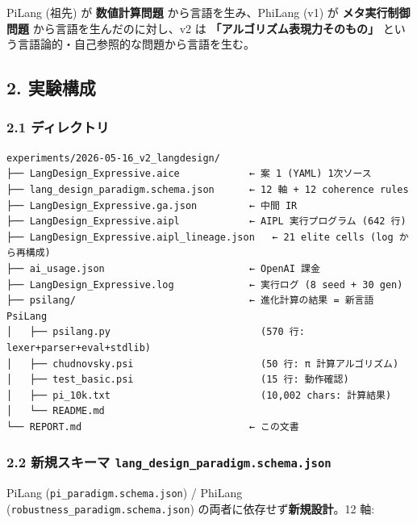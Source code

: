\documentclass[
]{ltjsarticle}
\begin{document}
PiLang (祖先) が \textbf{数値計算問題} から言語を生み、PhiLang (v1) が
\textbf{メタ実行制御問題} から言語を生んだのに対し、v2 は
\textbf{「アルゴリズム表現力そのもの」}
という言語論的・自己参照的な問題から言語を生む。

\subsection{2. 実験構成}\label{ux5b9fux9a13ux69cbux6210}

\subsubsection{2.1
ディレクトリ}\label{ux30c7ux30a3ux30ecux30afux30c8ux30ea}

\begin{verbatim}
experiments/2026-05-16_v2_langdesign/
├── LangDesign_Expressive.aice            ← 案 1 (YAML) 1次ソース
├── lang_design_paradigm.schema.json      ← 12 軸 + 12 coherence rules
├── LangDesign_Expressive.ga.json         ← 中間 IR
├── LangDesign_Expressive.aipl            ← AIPL 実行プログラム (642 行)
├── LangDesign_Expressive.aipl_lineage.json   ← 21 elite cells (log から再構成)
├── ai_usage.json                         ← OpenAI 課金
├── LangDesign_Expressive.log             ← 実行ログ (8 seed + 30 gen)
├── psilang/                              ← 進化計算の結果 = 新言語 PsiLang
│   ├── psilang.py                          (570 行: lexer+parser+eval+stdlib)
│   ├── chudnovsky.psi                      (50 行: π 計算アルゴリズム)
│   ├── test_basic.psi                      (15 行: 動作確認)
│   ├── pi_10k.txt                          (10,002 chars: 計算結果)
│   └── README.md
└── REPORT.md                             ← この文書
\end{verbatim}

\subsubsection{\texorpdfstring{2.2 新規スキーマ
\texttt{lang\_design\_paradigm.schema.json}}{2.2 新規スキーマ lang\_design\_paradigm.schema.json}}\label{ux65b0ux898fux30b9ux30adux30fcux30de-lang_design_paradigm.schema.json}

PiLang (\texttt{pi\_paradigm.schema.json}) / PhiLang
(\texttt{robustness\_paradigm.schema.json})
の両者に依存せず\textbf{新規設計}。12 軸:
\end{document}
